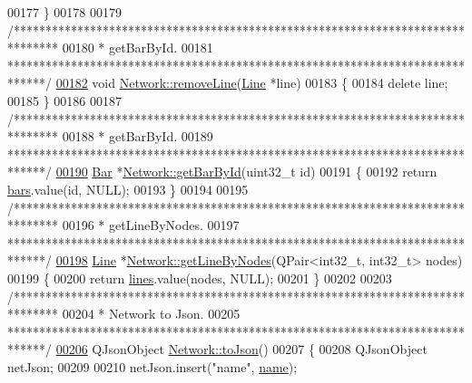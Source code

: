 \begin{DoxyCode}
00177 \}
00178 
00179 \textcolor{comment}{/*******************************************************************************}
00180 \textcolor{comment}{ * getBarById.}
00181 \textcolor{comment}{ ******************************************************************************/}
\hypertarget{network_8cpp_source_l00182}{}\hyperlink{group___graphics_ga4fd51288aa75614593977ce8aab9100f}{00182} \textcolor{keywordtype}{void} \hyperlink{group___graphics_ga1eef3317224a7a06348fce07e581a9ad}{Network::removeLine}(\hyperlink{class_line}{Line} *line)
00183 \{
00184   \textcolor{keyword}{delete} line;
00185 \}
00186 
00187 \textcolor{comment}{/*******************************************************************************}
00188 \textcolor{comment}{ * getBarById.}
00189 \textcolor{comment}{ ******************************************************************************/}
\hypertarget{network_8cpp_source_l00190}{}\hyperlink{group___graphics_ga04d524ce0fa0dd0d06deda92b1597af0}{00190} \hyperlink{class_bar}{Bar} *\hyperlink{group___graphics_ga04d524ce0fa0dd0d06deda92b1597af0}{Network::getBarById}(uint32\_t \textcolor{keywordtype}{id})
00191 \{
00192   \textcolor{keywordflow}{return} \hyperlink{class_network_a7fe628f7de34a96235cbd3f2cee4aff2}{bars}.value(\textcolor{keywordtype}{id}, NULL);
00193 \}
00194 
00195 \textcolor{comment}{/*******************************************************************************}
00196 \textcolor{comment}{ * getLineByNodes.}
00197 \textcolor{comment}{ ******************************************************************************/}
\hypertarget{network_8cpp_source_l00198}{}\hyperlink{group___graphics_ga8f090b85a7779695cb9f05b6395b3044}{00198} \hyperlink{class_line}{Line} *\hyperlink{group___graphics_ga8f090b85a7779695cb9f05b6395b3044}{Network::getLineByNodes}(QPair<int32\_t, int32\_t> nodes)
00199 \{
00200   \textcolor{keywordflow}{return} \hyperlink{class_network_acda0fd42e712e460a08a0e96511ee7eb}{lines}.value(nodes, NULL);
00201 \}
00202 
00203 \textcolor{comment}{/*******************************************************************************}
00204 \textcolor{comment}{ * Network to Json.}
00205 \textcolor{comment}{ ******************************************************************************/}
\hypertarget{network_8cpp_source_l00206}{}\hyperlink{group___graphics_ga1bb9773d3935eefef84136d388786494}{00206} QJsonObject \hyperlink{group___graphics_ga1bb9773d3935eefef84136d388786494}{Network::toJson}()
00207 \{
00208   QJsonObject netJson;
00209 
00210   netJson.insert(\textcolor{stringliteral}{"name"}, \hyperlink{class_network_ab6643733a517f930c60b06f5ffd78186}{name});

\end{DoxyCode}
